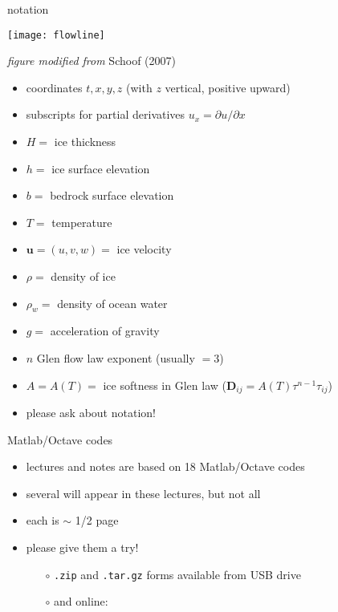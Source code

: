 \begin{frame}{notation} 

\begin{center}
  \texttt{[image: flowline]}

\tiny \emph{figure modified from} Schoof (2007)
\end{center}

\scriptsize
  \begin{itemize}
  \item coordinates $t,x,y,z$  (with $z$ vertical, positive upward)
  \item subscripts for partial derivatives $u_x = \partial u/\partial x$
  \item $H=$ ice thickness
  \item $h=$ ice surface elevation
  \item $b=$ bedrock surface elevation
  \item $T=$ temperature
  \item $\mathbf{u}=(u,v,w)=$ ice velocity
  \item $\rho=$ density of ice
  \item $\rho_w=$ density of ocean water
  \item $g=$ acceleration of gravity
  \item $n$ Glen flow law exponent (usually $=3$)
  \item $A=A(T)=$ ice softness in Glen law ($\mathbf{D}_{ij} = A(T) \tau^{n-1} \tau_{ij}$)
  \item \alert{please ask about notation!}
  \end{itemize}

\end{frame}


\begin{frame}{Matlab/Octave codes}

\begin{itemize}
\item lectures and notes are based on 18 Matlab/Octave codes
\item several will appear in these lectures, but not all
\item each is $\sim$ 1/2 page
\item please give them a try!

  \begin{itemize}
  \item[$\circ$] \texttt{.zip} and \texttt{.tar.gz} forms available from USB drive
  \item[$\circ$] and online:

  \bigskip\bigskip\small
  \centerline{}
  
  \end{itemize}
\end{itemize}
\end{frame}



